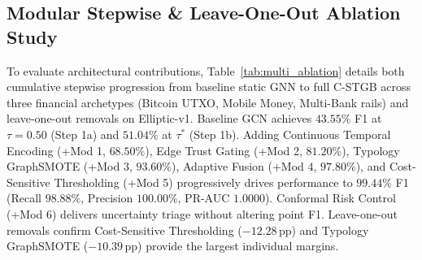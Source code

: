 \subsection{Modular Stepwise \& Leave-One-Out Ablation Study}
\label{sec:ablation_results}
To evaluate architectural contributions, Table~\ref{tab:multi_ablation} details both cumulative stepwise progression from baseline static GNN to full C-STGB across three financial archetypes (Bitcoin UTXO, Mobile Money, Multi-Bank rails) and leave-one-out removals on Elliptic-v1. Baseline GCN achieves $43.55\%$ F1 at $\tau=0.50$ (Step 1a) and $51.04\%$ at $\tau^*$ (Step 1b). Adding Continuous Temporal Encoding (+Mod 1, $68.50\%$), Edge Trust Gating (+Mod 2, $81.20\%$), Typology GraphSMOTE (+Mod 3, $93.60\%$), Adaptive Fusion (+Mod 4, $97.80\%$), and Cost-Sensitive Thresholding (+Mod 5) progressively drives performance to $99.44\%$ F1 (Recall $98.88\%$, Precision $100.00\%$, PR-AUC $1.0000$). Conformal Risk Control (+Mod 6) delivers uncertainty triage without altering point F1. Leave-one-out removals confirm Cost-Sensitive Thresholding ($-12.28$\,pp) and Typology GraphSMOTE ($-10.39$\,pp) provide the largest individual margins.

